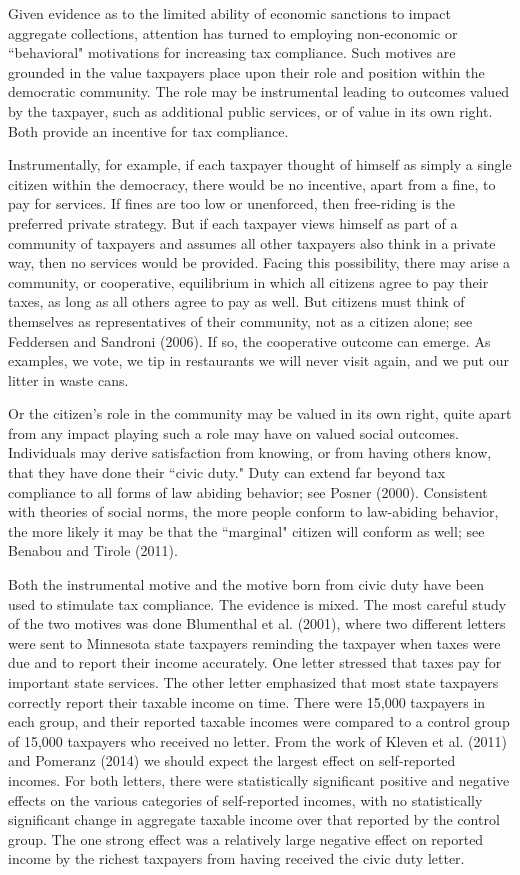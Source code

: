 \documentclass[12pt,titlepage]{article}
\begin{document}
Given evidence as to the limited ability of economic sanctions to
impact aggregate collections, attention has turned to employing
non-economic or ``behavioral" motivations for increasing tax
compliance.  Such motives are grounded in the value taxpayers place
upon their role and position within the democratic community.  The
role may be instrumental leading to outcomes valued by the taxpayer,
such as additional public services, or of value in its own right.
Both provide an incentive for tax compliance.

Instrumentally, for example, if each taxpayer thought of himself as
simply a single citizen within the democracy, there would be no
incentive, apart from a fine, to pay for services.  If fines are too
low or unenforced, then free-riding is the preferred private strategy.
But if each taxpayer views himself as part of a community of taxpayers
and assumes all other taxpayers also think in a private way, then no
services would be provided.  Facing this possibility, there may arise
a community, or cooperative, equilibrium in which all citizens agree
to pay their taxes, as long as all others agree to pay as well.  But
citizens must think of themselves as representatives of their
community, not as a citizen alone; see Feddersen and Sandroni (2006).
If so, the cooperative outcome can emerge.  As examples, we vote, we
tip in restaurants we will never visit again, and we put our litter in
waste cans.

Or the citizen's role in the community may be valued in its own right,
quite apart from any impact playing such a role may have on valued
social outcomes.  Individuals may derive satisfaction from knowing, or
from having others know, that they have done their ``civic duty."
Duty can extend far beyond tax compliance to all forms of law abiding
behavior; see Posner (2000).  Consistent with theories of social
norms, the more people conform to law-abiding behavior, the more
likely it may be that the ``marginal" citizen will conform as well;
see Benabou and Tirole (2011).

Both the instrumental motive and the motive born from civic duty have
been used to stimulate tax compliance.  The evidence is mixed.  The
most careful study of the two motives was done Blumenthal et
al. (2001), where two different letters were sent to Minnesota state
taxpayers reminding the taxpayer when taxes were due and to report
their income accurately.  One letter stressed that taxes pay for
important state services.  The other letter emphasized that most state
taxpayers correctly report their taxable income on time.  There were
15,000 taxpayers in each group, and their reported taxable incomes
were compared to a control group of 15,000 taxpayers who received no
letter.  From the work of Kleven et al. (2011) and Pomeranz (2014) we
should expect the largest effect on self-reported incomes.  For both
letters, there were statistically significant positive and negative
effects on the various categories of self-reported incomes, with no
statistically significant change in aggregate taxable income over that
reported by the control group.  The one strong effect was a relatively
large negative effect on reported income by the richest taxpayers from
having received the civic duty letter.
\end{document}

